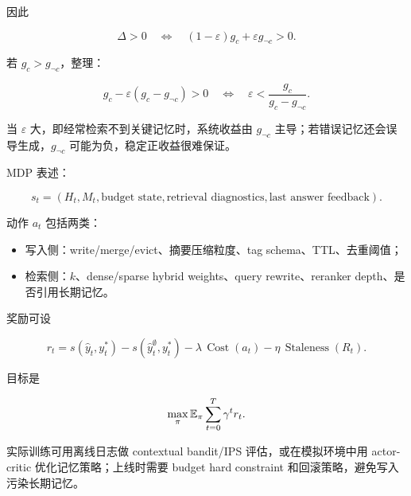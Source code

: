 因此

\[
  \Delta>0
  \quad\Longleftrightarrow\quad
  (1-\varepsilon)g_c+\varepsilon g_{\neg c}>0.
\]

若 \(g_c>g_{\neg c}\)，整理：

\[
  g_c-\varepsilon(g_c-g_{\neg c})>0
  \quad\Longleftrightarrow\quad
  \varepsilon<\frac{g_c}{g_c-g_{\neg c}}.
\]

当 \(\varepsilon\) 大，即经常检索不到关键记忆时，系统收益由 \(g_{\neg c}\) 主导；若错误记忆还会误导生成，\(g_{\neg c}\) 可能为负，稳定正收益很难保证。

MDP 表述：

\[
  s_t=(H_t,M_t,\text{budget state},\text{retrieval diagnostics},\text{last answer feedback}).
\]

动作 \(a_t\) 包括两类：

\begin{itemize}
  \item 写入侧：write/merge/evict、摘要压缩粒度、tag schema、TTL、去重阈值；
  \item 检索侧：\(k\)、dense/sparse hybrid weights、query rewrite、reranker depth、是否引用长期记忆。
\end{itemize}

奖励可设

\[
  r_t=
  s(\hat y_t,y_t^*)-
  s(\hat y_t^{\emptyset},y_t^*)
  -
  \lambda\,\operatorname{Cost}(a_t)
  -
  \eta\,\operatorname{Staleness}(R_t).
\]

目标是

\[
  \max_\pi
  \mathbb{E}_\pi
  \sum_{t=0}^{T}\gamma^t r_t.
\]

实际训练可用离线日志做 contextual bandit/IPS 评估，或在模拟环境中用 actor-critic 优化记忆策略；上线时需要 budget hard constraint 和回滚策略，避免写入污染长期记忆。
